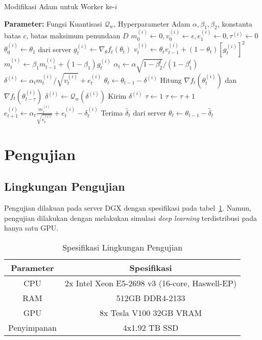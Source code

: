 \begin{algorithm}[ht]
  \caption{Modifikasi Adam untuk Worker ke-$i$}\label{myadam_worker}
  \begin{algorithmic}[1]
    \State \textbf{Parameter:} Fungsi Kuantisasi $\mathcal{Q}_w$, Hyperparameter Adam $\alpha, \beta_1, \beta_2$, konstanta batas $c$, batas maksimum penundaan $D$
    \State $m_0^{(i)} \gets 0, v_0^{(i)} \gets \epsilon, e_1^{(i)} \gets 0, \tau^{(i)} \gets 0$
    \State $\theta^{(i)}_0 \gets \theta_1$ dari server
    \State $g_t^{(i)} \gets \nabla_\theta f_t(\theta_{t})$
    \State $v_t^{(i)} \gets \theta_t v_{t-1}^{(i)} + (1-\theta_t)[g_t^{(i)}]^2$
    \State $m_t^{(i)} \gets \beta_1 m_{t-1}^{(i)} + (1-\beta_1)g_t^{(i)}$
    \State $\alpha_t \gets \alpha \sqrt{1-\beta_2^t}/(1-\beta_1^t)$
    \State $\delta^{(i)} \gets \alpha_t m_t^{(i)}/\sqrt{v_t^{(i)}}+e_t^{(i)}$
    \State $\theta_t \gets \theta_{t-1} - \delta^{(i)}$
    \State Hitung $\nabla f_t(\theta^{(i)}_{t})$ dan $\nabla f_t(\theta^{(i)}_{t-\tau})$
    \State $\delta^{(i)} \gets \mathcal{Q}_w(\delta^{(i)})$
    \State Kirim $\delta^{(i)}$
    \State $\tau \gets 1$
    \Else
    \State $\tau \gets \tau + 1$
    \EndIf
    \State $e_{t+1}^{(i)} \gets \alpha_t \frac{m_t^{(i)}}{\sqrt{v_t^{(i)}}} + e_t^{(i)} - \delta_t^{(i)}$
    \State Terima $\tilde{\delta_t}$ dari server
    \State $\theta_{t} \gets \theta_{t-1} - \tilde{\delta_t}$
    \EndFor
  \end{algorithmic}
\end{algorithm}

\section{Pengujian}
\subsection{Lingkungan Pengujian}
Pengujian dilakuan pada server DGX dengan spesifikasi pada tabel~\ref{dgx}. Namun, pengujian dilakukan dengan melakukan simulasi \emph{deep learning} terdistribusi pada hanya satu GPU.

\begin{table}[ht]
  \caption{Spesifikasi Lingkungan Pengujian}\label{dgx}
  \centering
  \begin{tabular}[ht]{ | c | c | }
    \hline
    \textbf{Parameter} & \textbf{Spesifikasi}                           \\
    \hline
    CPU                & 2x Intel Xeon E5-2698 v3 (16-core, Haswell-EP) \\
    \hline
    RAM                & 512GB DDR4-2133                                \\
    \hline
    GPU                & 8x Tesla V100 32GB VRAM                        \\
    \hline
    Penyimpanan        & 4x1.92 TB SSD                                  \\
    \hline
  \end{tabular}
\end{table}

